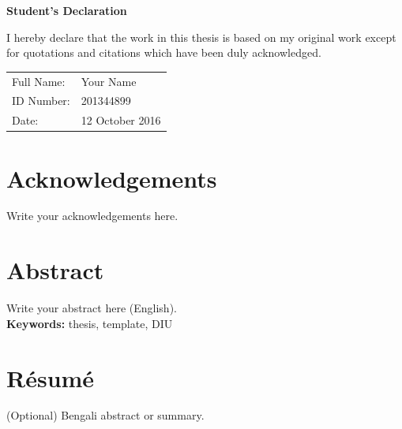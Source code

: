\documentclass[12pt,a4paper]{report}
\newcommand{\authorname}{Your Name}
\begin{document}
\vfill
\clearpage

\thispagestyle{empty}
\vspace*{3cm}
\begin{center}
  {\Large \textbf{Student's Declaration}}\\[1cm]
\end{center}

I hereby declare that the work in this thesis is based on my original work except for quotations and citations which have been duly acknowledged.\\[6mm]

\begin{tabular}{l l}
Full Name: & \authorname \\
ID Number: & 201344899 \\
Date: & 12 October 2016 \\
\end{tabular}

\clearpage

\setcounter{page}{1}
\chapter*{Acknowledgements}
Write your acknowledgements here.

\chapter*{Abstract}
Write your abstract here (English).\\
\textbf{Keywords:} thesis, template, DIU

\chapter*{Résumé}
(Optional) Bengali abstract or summary.

\tableofcontents
\listoffigures
\listoftables
\cleardoublepage

\setcounter{page}{1}







\cleardoublepage
\printbibliography[title={References}]

\appendix

\end{document}
